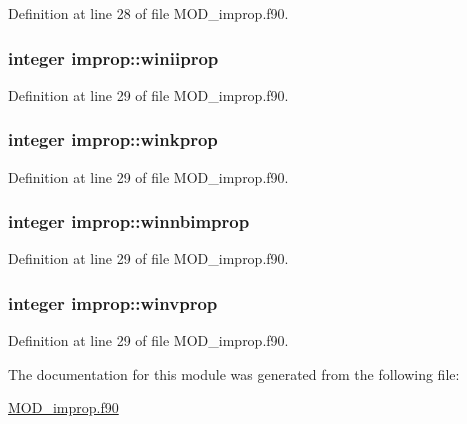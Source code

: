 Definition at line 28 of file M\-O\-D\-\_\-improp.\-f90.

\hypertarget{classimprop_a8c56319e755a1db0df931ca8a381cf30}{
\subsubsection[{winiiprop}]{\setlength{\rightskip}{0pt plus 5cm}integer improp\-::winiiprop}}\label{classimprop_a8c56319e755a1db0df931ca8a381cf30}


Definition at line 29 of file M\-O\-D\-\_\-improp.\-f90.

\hypertarget{classimprop_aebe3bf6448d31fd57415c218577a7ab6}{
\subsubsection[{winkprop}]{\setlength{\rightskip}{0pt plus 5cm}integer improp\-::winkprop}}\label{classimprop_aebe3bf6448d31fd57415c218577a7ab6}


Definition at line 29 of file M\-O\-D\-\_\-improp.\-f90.

\hypertarget{classimprop_afebdf157fb38d068fb62f4670bae8a79}{
\subsubsection[{winnbimprop}]{\setlength{\rightskip}{0pt plus 5cm}integer improp\-::winnbimprop}}\label{classimprop_afebdf157fb38d068fb62f4670bae8a79}


Definition at line 29 of file M\-O\-D\-\_\-improp.\-f90.

\hypertarget{classimprop_a78ffdd739524a23736dc1727b1668619}{
\subsubsection[{winvprop}]{\setlength{\rightskip}{0pt plus 5cm}integer improp\-::winvprop}}\label{classimprop_a78ffdd739524a23736dc1727b1668619}


Definition at line 29 of file M\-O\-D\-\_\-improp.\-f90.



The documentation for this module was generated from the following file\-:\begin{DoxyCompactItemize}
\item 
\hyperlink{MOD__improp_8f90}{M\-O\-D\-\_\-improp.\-f90}\end{DoxyCompactItemize}
